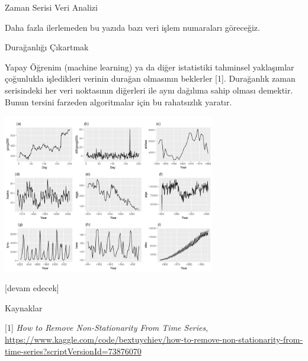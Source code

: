 \documentclass[12pt,fleqn]{article}\usepackage{../../common}
\begin{document}
Zaman Serisi Veri Analizi

Daha fazla ilerlemeden bu yazıda bazı veri işlem numaraları göreceğiz.

Durağanlığı Çıkartmak

Yapay Öğrenim (machine learning) ya da diğer istatistiki tahminsel yaklaşımlar
çoğunlukla işledikleri verinin durağan olmasının beklerler [1]. Durağanlık
zaman serisindeki her veri noktasının diğerleri ile aynı dağılıma sahip olması
demektir. Bunun tersini farzeden algoritmalar için bu rahatsızlık yaratır. 

\includegraphics[width=25em]{tser_008_data_01.png}












[devam edecek]

Kaynaklar

[1] {\em How to Remove Non-Stationarity From Time Series},
    \url{https://www.kaggle.com/code/bextuychiev/how-to-remove-non-stationarity-from-time-series?scriptVersionId=73876070}
\end{document}

